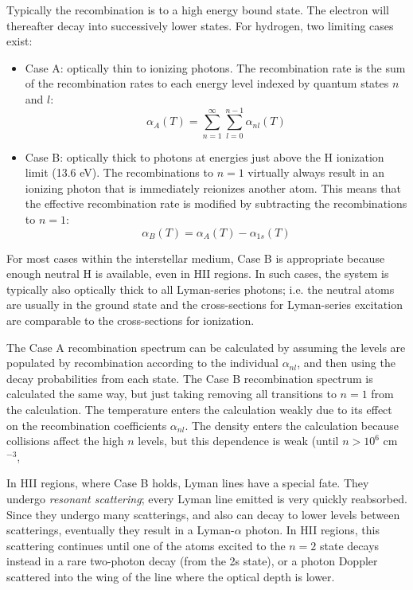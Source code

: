 Typically the recombination is to a high energy bound state. The
electron will thereafter decay into successively lower states. For
hydrogen, two limiting cases exist:
\begin{itemize}
\item Case A: optically thin to ionizing photons. The recombination
  rate is the sum of the recombination rates to each energy level
  indexed by quantum states $n$ and $l$:
  \begin{equation}
    \alpha_A(T) =
    \sum_{n=1}^{\infty} 
    \sum_{l=0}^{n-1} \alpha_{nl}(T)
  \end{equation}
\item Case B: optically thick to photons at energies just above the H
  ionization limit (13.6 eV). The recombinations to $n=1$ 
  virtually always result in an ionizing photon that is
  immediately reionizes another atom. This means that the effective
  recombination rate is modified by subtracting the recombinations to
  $n=1$:
  \begin{equation}
    \alpha_B(T) = \alpha_A(T) - \alpha_{1s} (T)
  \end{equation}
\end{itemize}
For most cases within the interstellar medium, Case B is appropriate
because enough neutral H is available, even in HII regions. In such
cases, the system is typically also optically thick to all
Lyman-series photons; i.e. the neutral atoms are usually in the ground
state and the cross-sections for Lyman-series excitation are
comparable to the cross-sections for ionization.

The Case A recombination spectrum can be calculated by assuming the
levels are populated by recombination according to the individual
$\alpha_{nl}$, and then using the decay probabilities from each
state. The Case B recombination spectrum is calculated the same way,
but just taking removing all transitions to $n=1$ from the
calculation. The temperature enters the calculation weakly due to its
effect on the recombination coefficients $\alpha_{nl}$. The density
enters the calculation because collisions affect the high $n$ levels,
but this dependence is weak (until $n>10^6$ cm$^{-3}$,

In HII regions, where Case B holds, Lyman lines have a special
fate. They undergo {\it resonant scattering}; every Lyman line emitted
is very quickly reabsorbed. Since they undergo many scatterings, and
also can decay to lower levels between scatterings, eventually they
result in a Lyman-$\alpha$ photon. In HII regions, this scattering
continues until one of the atoms excited to the $n=2$ state decays
instead in a rare two-photon decay (from the 2s state), or a photon
Doppler scattered into the wing of the line where the optical depth is
lower.

